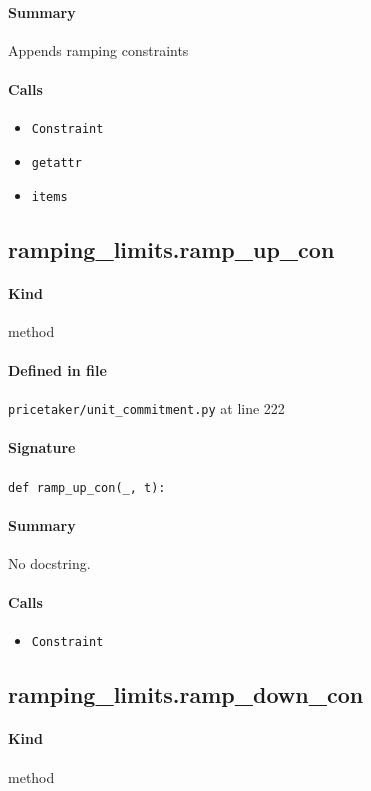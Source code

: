 \documentclass[11pt]{report}
\begin{document}
\paragraph{Summary} Appends ramping constraints
\paragraph{Calls}
\begin{itemize}[leftmargin=*]
  \item \texttt{Constraint}
  \item \texttt{getattr}
  \item \texttt{items}
\end{itemize}
\subsection{ramping\_limits.ramp\_up\_con}
\label{def:pricetaker-unit_commitment.py:ramping_limits.ramp_up_con:L222}
\paragraph{Kind} method
\paragraph{Defined in file} \texttt{pricetaker/unit\_commitment.py} at line 222
\paragraph{Signature} \texttt{def ramp\_up\_con(\_, t):}
\paragraph{Summary} No docstring.
\paragraph{Calls}
\begin{itemize}[leftmargin=*]
  \item \texttt{Constraint}
\end{itemize}
\subsection{ramping\_limits.ramp\_down\_con}
\label{def:pricetaker-unit_commitment.py:ramping_limits.ramp_down_con:L233}
\paragraph{Kind} method
\end{document}
